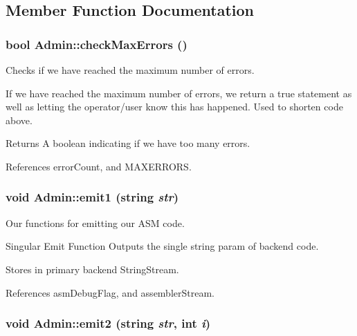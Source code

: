 \subsection{Member Function Documentation}
\hypertarget{classAdmin_af5cd211ee7891ec1fec719bace4b678b}{
\subsubsection[{checkMaxErrors}]{\setlength{\rightskip}{0pt plus 5cm}bool Admin::checkMaxErrors ()}}
\label{classAdmin_af5cd211ee7891ec1fec719bace4b678b}


Checks if we have reached the maximum number of errors. 

If we have reached the maximum number of errors, we return a true statement as well as letting the operator/user know this has happened. Used to shorten code above.

\begin{DoxyReturn}{Returns}
A boolean indicating if we have too many errors. 
\end{DoxyReturn}


References errorCount, and MAXERRORS.

\hypertarget{classAdmin_a8518362526e301c8ccd26eeff689b862}{
\subsubsection[{emit1}]{\setlength{\rightskip}{0pt plus 5cm}void Admin::emit1 (string {\em str})}}
\label{classAdmin_a8518362526e301c8ccd26eeff689b862}


Our functions for emitting our ASM code. 

Singular Emit Function Outputs the single string param of backend code.

Stores in primary backend StringStream. 

References asmDebugFlag, and assemblerStream.

\hypertarget{classAdmin_a7862a90db685a8321e47d684c67b6451}{
\subsubsection[{emit2}]{\setlength{\rightskip}{0pt plus 5cm}void Admin::emit2 (string {\em str}, \/  int {\em i})}}
\label{classAdmin_a7862a90db685a8321e47d684c67b6451}


